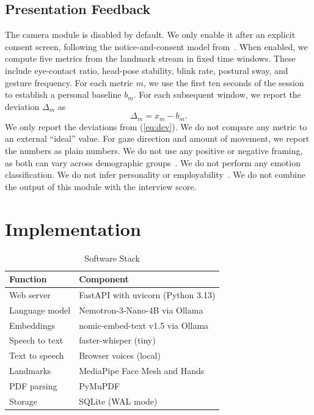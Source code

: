 \documentclass[conference]{IEEEtran}
\begin{document}
\subsection{Presentation Feedback}\label{sec:present}
The camera module is disabled by default. We only enable it after an explicit consent screen, following the notice-and-consent model from~\cite{illinois}. When enabled, we compute five metrics from the landmark stream in fixed time windows. These include eye-contact ratio, head-pose stability, blink rate, postural sway, and gesture frequency. For each metric $m$, we use the first ten seconds of the session to establish a personal baseline $b_m$. For each subsequent window, we report the deviation $\Delta_m$ as
\begin{equation}
\Delta_m = x_m - b_m.
\label{eq:dev}
\end{equation}
We only report the deviations from (\ref{eq:dev}). We do not compare any metric to an external ``ideal'' value. For gaze direction and amount of movement, we report the numbers as plain numbers. We do not use any positive or negative framing, as both can vary across demographic groups~\cite{booth2023}. We do not perform any emotion classification. We do not infer personality or employability~\cite{barrett2019,euaiact}. We do not combine the output of this module with the interview score.

\section{Implementation}\label{sec:impl}

\begin{table}[t]
\caption{Software Stack}
\label{tab:stack}
\centering
\footnotesize
\renewcommand{\arraystretch}{1.3}
\begin{tabular}{|l|l|}
\hline
\textbf{Function} & \textbf{Component} \\
\hline
Web server & FastAPI with uvicorn (Python 3.13) \\
Language model & Nemotron-3-Nano-4B via Ollama \\
Embeddings & nomic-embed-text v1.5 via Ollama \\
Speech to text & faster-whisper (tiny) \\
Text to speech & Browser voices (local) \\
Landmarks & MediaPipe Face Mesh and Hands \\
PDF parsing & PyMuPDF \\
Storage & SQLite (WAL mode) \\
\hline
\end{tabular}
\end{table}
\end{document}
